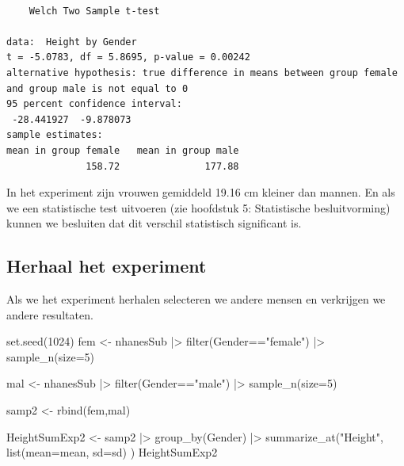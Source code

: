 \documentclass[
  dutch,
  letterpaper,
  12pt]{book}
\newenvironment{Shaded}{\begin{snugshade}}{\end{snugshade}}
\newcommand{\AttributeTok}[1]{\textcolor[rgb]{0.40,0.45,0.13}{#1}}
\newcommand{\DecValTok}[1]{\textcolor[rgb]{0.68,0.00,0.00}{#1}}
\newcommand{\FunctionTok}[1]{\textcolor[rgb]{0.28,0.35,0.67}{#1}}
\newcommand{\NormalTok}[1]{\textcolor[rgb]{0.00,0.23,0.31}{#1}}
\newcommand{\OtherTok}[1]{\textcolor[rgb]{0.00,0.23,0.31}{#1}}
\newcommand{\SpecialCharTok}[1]{\textcolor[rgb]{0.37,0.37,0.37}{#1}}
\newcommand{\StringTok}[1]{\textcolor[rgb]{0.13,0.47,0.30}{#1}}
\theoremstyle{definition}
\theoremstyle{definition}
\theoremstyle{definition}
\theoremstyle{remark}
\begin{document}
\begin{verbatim}

    Welch Two Sample t-test

data:  Height by Gender
t = -5.0783, df = 5.8695, p-value = 0.00242
alternative hypothesis: true difference in means between group female and group male is not equal to 0
95 percent confidence interval:
 -28.441927  -9.878073
sample estimates:
mean in group female   mean in group male 
              158.72               177.88 
\end{verbatim}

In het experiment zijn vrouwen gemiddeld 19.16 cm kleiner dan mannen. En
als we een statistische test uitvoeren (zie hoofdstuk 5: Statistische
besluitvorming) kunnen we besluiten dat dit verschil statistisch
significant is.

\subsection{Herhaal het experiment}\label{herhaal-het-experiment}

Als we het experiment herhalen selecteren we andere mensen en verkrijgen
we andere resultaten.

\begin{Shaded}
\begin{Highlighting}[]
\FunctionTok{set.seed}\NormalTok{(}\DecValTok{1024}\NormalTok{)}
\NormalTok{fem }\OtherTok{\textless{}{-}}\NormalTok{ nhanesSub }\SpecialCharTok{|\textgreater{}}
  \FunctionTok{filter}\NormalTok{(Gender}\SpecialCharTok{==}\StringTok{"female"}\NormalTok{) }\SpecialCharTok{|\textgreater{}}
  \FunctionTok{sample\_n}\NormalTok{(}\AttributeTok{size=}\DecValTok{5}\NormalTok{)}

\NormalTok{mal }\OtherTok{\textless{}{-}}\NormalTok{ nhanesSub }\SpecialCharTok{|\textgreater{}}
  \FunctionTok{filter}\NormalTok{(Gender}\SpecialCharTok{==}\StringTok{"male"}\NormalTok{) }\SpecialCharTok{|\textgreater{}}
  \FunctionTok{sample\_n}\NormalTok{(}\AttributeTok{size=}\DecValTok{5}\NormalTok{)}

\NormalTok{samp2 }\OtherTok{\textless{}{-}} \FunctionTok{rbind}\NormalTok{(fem,mal)}

\NormalTok{HeightSumExp2 }\OtherTok{\textless{}{-}}\NormalTok{ samp2 }\SpecialCharTok{|\textgreater{}}
  \FunctionTok{group\_by}\NormalTok{(Gender) }\SpecialCharTok{|\textgreater{}}
  \FunctionTok{summarize\_at}\NormalTok{(}\StringTok{"Height"}\NormalTok{,}
               \FunctionTok{list}\NormalTok{(}\AttributeTok{mean=}\NormalTok{mean,}
                    \AttributeTok{sd=}\NormalTok{sd)}
\NormalTok{              )}
\NormalTok{HeightSumExp2}
\end{Highlighting}
\end{Shaded}
\end{document}
